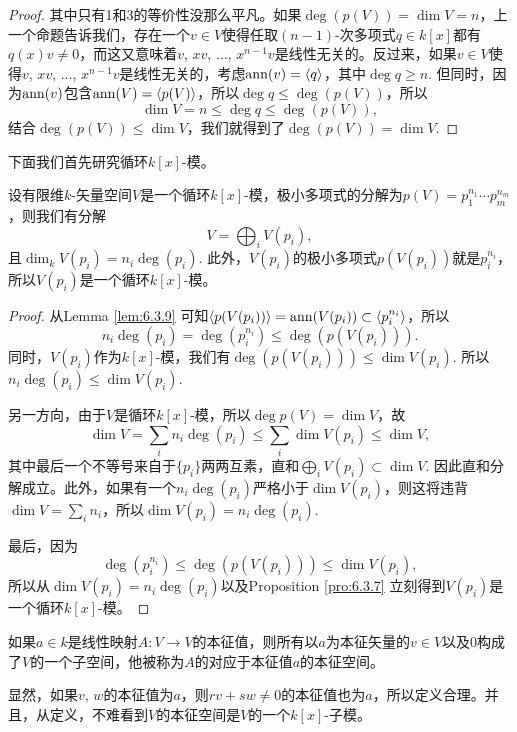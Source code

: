 \begin{proof}
    其中只有1和3的等价性没那么平凡。如果$\deg(p(V))=\dim V=n$，上一个命题告诉我们，存在一个$v\in V$使得任取$(n-1)$-次多项式$q\in k[x]$都有$q(x)v\neq 0$，而这又意味着$v$, $xv$, $\dots$, $x^{n-1}v$是线性无关的。反过来，如果$v\in V$使得$v$, $xv$, $\dots$, $x^{n-1}v$是线性无关的，考虑$\operatorname{ann}(v)=\langle q\rangle$，其中$\deg q\geq n$. 但同时，因为$\operatorname{ann}(v)$包含$\operatorname{ann}(V)=\langle p(V)\rangle$，所以$\deg q\leq \deg(p(V))$，所以
    \[
        \dim V=n\leq \deg q\leq \deg(p(V)),
    \]
    结合$\deg(p(V))\leq \dim V$，我们就得到了$\deg(p(V))=\dim V$.
\end{proof}

下面我们首先研究循环$k[x]$-模。

\begin{pro}\label{pro:6.3.10}
    设有限维$k$-矢量空间$V$是一个循环$k[x]$-模，极小多项式的分解为$p(V)=p_1^{n_1}\cdots p_m^{n_m}$，则我们有分解
    \[
       V=\bigoplus_i V(p_i),
    \]
    且$\dim_k V(p_i)=n_i\deg(p_i)$. 此外，$V(p_i)$的极小多项式$p(V(p_i))$就是$p_i^{n_i}$，所以$V(p_i)$是一个循环$k[x]$-模。
\end{pro}

\begin{proof}
    从Lemma \ref{lem:6.3.9} 可知$\langle p(V(p_i))\rangle=\operatorname{ann} (V(p_i))\subset \langle p_i^{n_i}\rangle$，所以
    \[n_i\deg(p_i)=\deg (p_i^{n_i})\leq \deg (p(V(p_i))).\]
    同时，$V(p_i)$作为$k[x]$-模，我们有$\deg (p(V(p_i))) \leq \dim V(p_i)$. 所以$n_i\deg(p_i)\leq \dim V(p_i)$. 
    
    另一方向，由于$V$是循环$k[x]$-模，所以$\deg p(V)=\dim V$，故
    \[
        \dim V=\sum_i n_i\deg(p_i)\leq \sum_i\dim V(p_i)\leq \dim V,
    \]
    其中最后一个不等号来自于$\{p_i\}$两两互素，直和$\bigoplus_i V(p_i)\subset \dim V$. 因此直和分解成立。此外，如果有一个$n_i\deg(p_i)$严格小于$\dim V(p_i)$，则这将违背$\dim V=\sum_i n_i$，所以$\dim V(p_i)=n_i\deg(p_i)$.

    最后，因为
    \[
        \deg(p_i^{n_i})\leq \deg (p(V(p_i)))\leq \dim V(p_i),
    \]
    所以从$\dim V(p_i)=n_i\deg(p_i)$以及Proposition \ref{pro:6.3.7} 立刻得到$V(p_i)$是一个循环$k[x]$-模。
\end{proof}

\begin{para}[本征空间]
    如果$a\in k$是线性映射$A:V\to V$的本征值，则所有以$a$为本征矢量的$v\in V$以及$0$构成了$V$的一个子空间，他被称为$A$的对应于本征值$a$的本征空间。

    显然，如果$v$, $w$的本征值为$a$，则$rv+sw\neq 0$的本征值也为$a$，所以定义合理。并且，从定义，不难看到$V$的本征空间是$V$的一个$k[x]$-子模。
\end{para}

